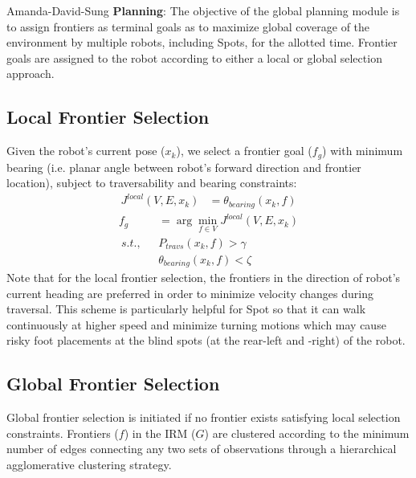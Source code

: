 \documentclass[a4paper, 10pt, conference]{ieeeconf}      %
\newcommand{\ph}[1]{{\textbf{#1}:}} %
\newcommand{\todo}[1]{{\color{red} #1 }} %
\begin{document}

\todo{Amanda-David-Sung} \ph{Planning} 
The objective of the global planning module is to assign frontiers as terminal goals as to maximize global coverage of the environment by multiple robots, including Spots, for the allotted time. Frontier goals are assigned to the robot according to either a local or global selection approach. 
\subsection{Local Frontier Selection}
Given the robot's current pose ($x_k$), we select a frontier goal ($f_g$) with minimum bearing (i.e. planar angle between robot's forward direction and frontier location), subject to traversability and bearing constraints:
\begin{align}
    J^{local}(V, E, x_k) &= \theta_{bearing}(x_k, f) 
\end{align}
\begin{align}
    f_g &= \arg\min_{f\in V} J^{local}(V, E, x_k)\\
    ~s.t.,~~~ & P_{travs}(x_k, f) > \gamma \nonumber \\
    & \theta_{bearing}(x_k, f) < \zeta \nonumber
\end{align}
Note that for the local frontier selection, the frontiers in the direction of robot's current heading are preferred in order to minimize velocity changes during traversal. This scheme is particularly helpful for Spot so that it can walk continuously at higher speed and minimize turning motions which may cause risky foot placements at the blind spots (at the rear-left and -right) of the robot.
\subsection{Global Frontier Selection}
Global frontier selection is initiated if no frontier exists satisfying local selection constraints. Frontiers ($f$) in the IRM ($G$) are clustered according to the minimum number of edges connecting any two sets of observations through a hierarchical agglomerative clustering strategy. 
\end{document}
